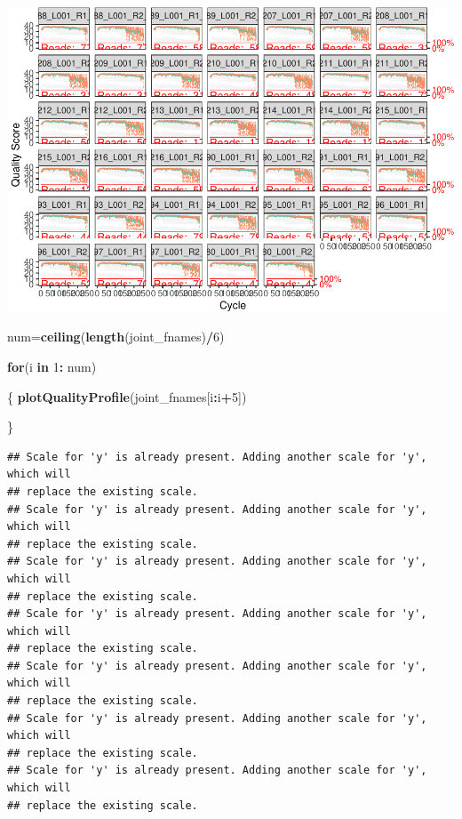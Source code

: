 \documentclass[
]{book}
\newenvironment{Shaded}{\begin{snugshade}}{\end{snugshade}}
\newcommand{\ControlFlowTok}[1]{\textcolor[rgb]{0.13,0.29,0.53}{\textbf{#1}}}
\newcommand{\DecValTok}[1]{\textcolor[rgb]{0.00,0.00,0.81}{#1}}
\newcommand{\KeywordTok}[1]{\textcolor[rgb]{0.13,0.29,0.53}{\textbf{#1}}}
\newcommand{\NormalTok}[1]{#1}
\newcommand{\OperatorTok}[1]{\textcolor[rgb]{0.81,0.36,0.00}{\textbf{#1}}}
\newcommand{\StringTok}[1]{\textcolor[rgb]{0.31,0.60,0.02}{#1}}
\begin{document}
\includegraphics{16sworkshop_files/figure-latex/make_plots-2.pdf}

\begin{Shaded}
\begin{Highlighting}[]
\NormalTok{num=}\KeywordTok{ceiling}\NormalTok{(}\KeywordTok{length}\NormalTok{(joint_fnames)}\OperatorTok{/}\DecValTok{6}\NormalTok{)}

\ControlFlowTok{for}\NormalTok{(i }\ControlFlowTok{in} \DecValTok{1}\OperatorTok{:}\StringTok{ }\NormalTok{num)}

\NormalTok{\{}
  \KeywordTok{plotQualityProfile}\NormalTok{(joint_fnames[i}\OperatorTok{:}\NormalTok{i}\OperatorTok{+}\DecValTok{5}\NormalTok{])}


\NormalTok{\}}
\end{Highlighting}
\end{Shaded}

\begin{verbatim}
## Scale for 'y' is already present. Adding another scale for 'y', which will
## replace the existing scale.
## Scale for 'y' is already present. Adding another scale for 'y', which will
## replace the existing scale.
## Scale for 'y' is already present. Adding another scale for 'y', which will
## replace the existing scale.
## Scale for 'y' is already present. Adding another scale for 'y', which will
## replace the existing scale.
## Scale for 'y' is already present. Adding another scale for 'y', which will
## replace the existing scale.
## Scale for 'y' is already present. Adding another scale for 'y', which will
## replace the existing scale.
## Scale for 'y' is already present. Adding another scale for 'y', which will
## replace the existing scale.
\end{verbatim}
\end{document}
